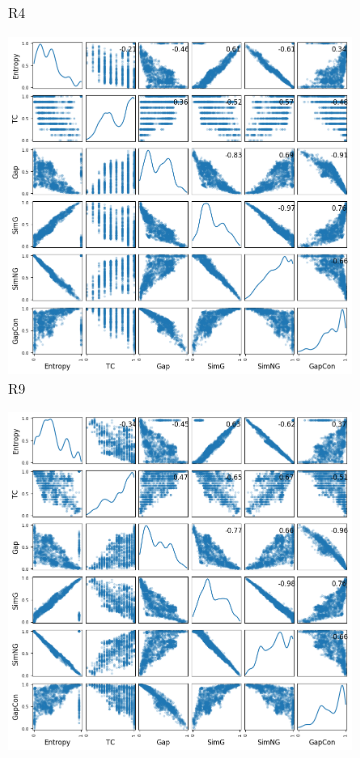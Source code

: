 \begin{figure}[!htbp]
\begin{adjustwidth}{-1cm}{-1cm}
\begin{subfigure}{0.35\textwidth}
			\caption{R4}
		\end{subfigure}
		\begin{subfigure}{0.35\textwidth}
			\includegraphics[width=\columnwidth]{Figure/6-obj-old/R9/fig/scatter_mattrix}
			\caption{R9}
		\end{subfigure}
		\begin{subfigure}{0.35\textwidth}
			\includegraphics[width=\columnwidth]{Figure/6-obj-old/R14/fig/scatter_mattrix}

\end{subfigure}
\end{adjustwidth}
\end{figure}
